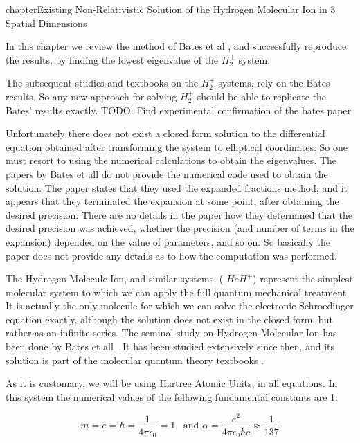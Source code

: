 chapter{Existing Non-Relativistic Solution of the Hydrogen Molecular Ion in 3 Spatial Dimensions}

In this chapter we review the method of Bates et al \cite{Bates1}, and successfully reproduce the results, by finding the lowest eigenvalue of the $ H_2^{+} $ system.

The subsequent studies and textbooks on the $ H_2^{+} $ systems, rely on the Bates results. So any new approach for solving $ H_2^{+} $ should be able to replicate the Bates' results exactly.  TODO: Find experimental confirmation of the bates paper

Unfortunately there does not exist a closed form solution to the differential equation obtained after transforming the system to elliptical coordinates. So one must resort to using the numerical calculations to obtain the eigenvalues. 
The papers by Bates et all \cite{Bates1}\cite{Bates2} do not provide the numerical code used to obtain the solution. The paper states that they used the expanded fractions method, and it appears that they terminated the expansion at some point, after obtaining the desired precision. There are no details in the paper how they determined that the desired precision was achieved, whether the precision (and number of terms in the expansion) depended on the value of parameters, and so on. So basically the paper does not provide any details as to how the computation was performed. 

The Hydrogen Molecule Ion, and similar systems, ( $ HeH^{+} $) represent the simplest molecular system to which we can apply the full quantum mechanical treatment. It is actually the only molecule for which we can solve the electronic Schroedinger equation exactly, although the solution does not exist in the closed form, but rather as an infinite series. The seminal study on Hydrogen Molecular Ion has been done by Bates et all \cite{Bates1}\cite{Bates2}. It has been studied extensively since then, and its solution is part of the molecular quantum theory textbooks \cite{Slater}.

As it is customary, we will be using Hartree Atomic Units, in all equations. In this system the numerical values of the following fundamental constants are 1:

\begin{equation}\label{Atomic}
m = e = \hbar = \frac{1}{4\pi\epsilon_0} = 1\,\,\,\text{ and } \alpha = \frac{e^2}{4\pi\epsilon_0\hbar c} \approx \frac{1}{137}
\end{equation}

